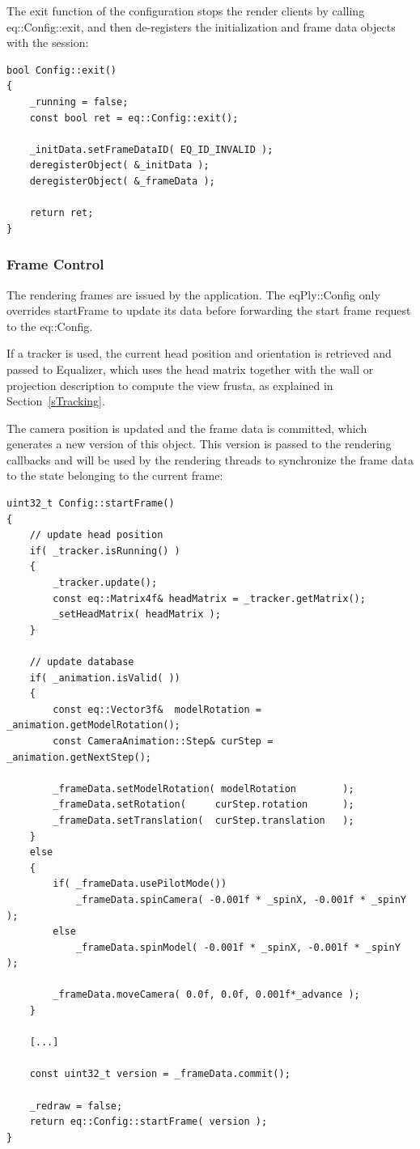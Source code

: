 \documentclass[10pt,a4]{scrartcl}
\newcommand{\sref}[1]{Section~\ref{#1}}
\begin{document}
The exit function of the configuration stops the render clients by calling
\textsf{eq::Con\-fig::exit}, and then de-registers the initialization and
frame data objects with the session:

{\footnotesize\begin{lstlisting}
bool Config::exit()
{
    _running = false;
    const bool ret = eq::Config::exit();

    _initData.setFrameDataID( EQ_ID_INVALID );
    deregisterObject( &_initData );
    deregisterObject( &_frameData );

    return ret;
}
\end{lstlisting}}

\subsubsection{Frame Control}

The rendering frames are issued by the application. The
\textsf{eqPly::Config} only overrides \textsf{startFrame} to
update its data before forwarding the start frame request to the
\textsf{eq::Config}.

If a tracker is used, the current head position and orientation is
retrieved and passed to Equalizer, which uses the head matrix together
with the wall or projection description to compute the view
frusta, as explained in \sref{sTracking}.

The camera position is updated and the frame data is committed, which
generates a new version of this object. This version is passed to the
rendering callbacks and will be used by the rendering threads to
synchronize the frame data to the state belonging to the current frame:

{\footnotesize\begin{lstlisting}
uint32_t Config::startFrame()
{
    // update head position
    if( _tracker.isRunning() )
    {
        _tracker.update();
        const eq::Matrix4f& headMatrix = _tracker.getMatrix();
        _setHeadMatrix( headMatrix );
    }

    // update database
    if( _animation.isValid( ))
    {
        const eq::Vector3f&  modelRotation = _animation.getModelRotation();
        const CameraAnimation::Step& curStep = _animation.getNextStep();

        _frameData.setModelRotation( modelRotation        );
        _frameData.setRotation(     curStep.rotation      );
        _frameData.setTranslation(  curStep.translation   );
    }
    else
    {
        if( _frameData.usePilotMode())
            _frameData.spinCamera( -0.001f * _spinX, -0.001f * _spinY );
        else
            _frameData.spinModel( -0.001f * _spinX, -0.001f * _spinY );

        _frameData.moveCamera( 0.0f, 0.0f, 0.001f*_advance );
    }

    [...]

    const uint32_t version = _frameData.commit();

    _redraw = false;
    return eq::Config::startFrame( version );
}
\end{lstlisting}}
\end{document}
